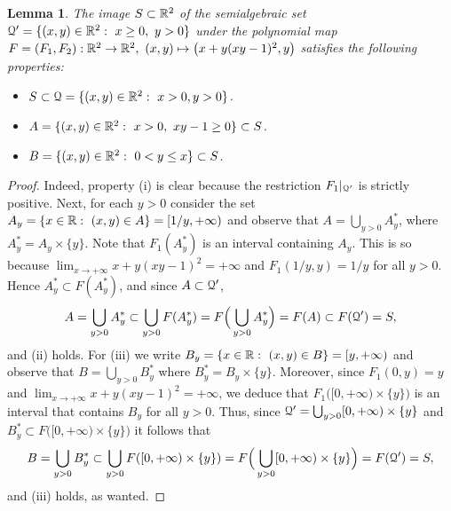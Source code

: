 \documentclass[11pt,a4paper]{amsart}
\newtheorem{lem}[theor]{Lemma}
\theoremstyle{definition}
\theoremstyle{remark}
\newcommand{\Qq}{{\EuScript Q}}
\begin{document}
\begin{lem}\label{step2}
The image $S\subset{\mathbb R}^2$ of the semialgebraic set $\Qq'=\{(x,y)\in\R^2:\ x\geq0,\ y>0\}$ under the polynomial map $F=(F_1,F_2):\R^2\to\R^2,\ (x,y)\mapsto\big(x+y(xy-1)^2,y\big)$ satisfies the following properties:
\begin{itemize}
\item[(i)] $S\subset\Qq=\{(x,y)\in\R^2:\ x>0,y>0\}$.
\item[(ii)] $A=\{(x,y)\in\R^2:\ x>0,\ xy-1\geq0\}\subset S$.
\item[(iii)] $B=\{(x,y)\in{\mathbb R}^2:\ 0<y\leq x\}\subset S$.
\end{itemize}
\end{lem}
\begin{proof}
Indeed, property (i) is clear because the restriction $F_1|_{\Qq'}$ is strictly positive. Next, for each $y>0$ consider the set $A_y=\{x\in{\mathbb R}:\ (x,y)\in A\}=[1/y,+\infty)$ and observe that $A=\bigcup_{y>0}A_y^*$, where $A_y^*=A_y\times\{y\}$. Note that $F_1(A_y^*)$ is an interval containing $A_y$. This is so because $\lim_{x\to+\infty}x+y(xy-1)^2=+\infty$ and $F_1(1/y,y)=1/y$ for all $y>0$. Hence $A_y^*\subset F(A_y^*)$, and since $A\subset\Qq'$, 
$$
A=\bigcup_{y>0}A_y^*\subset\bigcup_{y>0}F(A_y^*)=F\Big(\bigcup_{y>0}A_y^*\Big)=F(A)\subset F(\Qq')=S,
$$
and (ii) holds. For (iii) we write $B_y=\{x\in{\mathbb R}:\ (x,y)\in B\}=[y,+\infty)$ and observe that $B=\bigcup_{y>0}B_y^*$ where $B_y^*=B_y\times\{y\}$. Moreover, since $F_1(0,y)=y$ and $\lim_{x\to+\infty}x+y(xy-1)^2=+\infty$, we deduce that $F_1\big([0,+\infty)\times\{y\}\big)$ is an interval that contains $B_y$ for all $y>0$. Thus, since $\Qq'=\bigcup_{y>0}[0,+\infty)\times\{y\}$ and $B_y^*\subset F\big([0,+\infty)\times\{y\}\big)$ it follows that
$$
B=\bigcup_{y>0}B_y^*\subset\bigcup_{y>0}F([0,+\infty)\times\{y\})=F\Big(\bigcup_{y>0}[0,+\infty)\times\{y\}\Big)=F(\Qq')=S,
$$
and (iii) holds, as wanted.
\end{proof}
\end{document}
